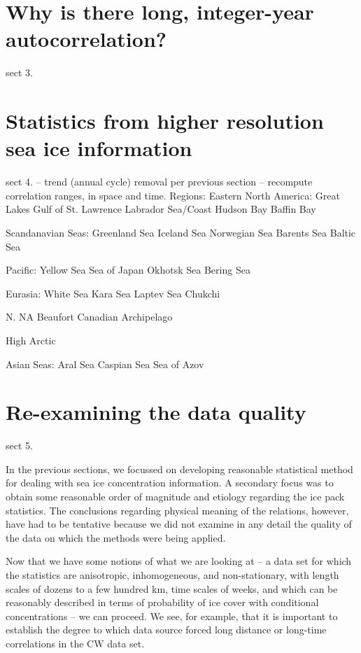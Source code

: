 \section{Why is there long, integer-year autocorrelation?}
sect 3.

\section{Statistics from higher resolution sea ice information}
sect 4.
-- trend (annual cycle) removal per previous section
-- recompute correlation ranges, in space and time.
Regions:
Eastern North America:
  Great Lakes
  Gulf of St. Lawrence
  Labrador Sea/Coast
  Hudson Bay
  Baffin Bay
  
Scandanavian Seas:
  Greenland Sea
  Iceland Sea
  Norwegian Sea
  Barents Sea
  Baltic Sea

Pacific:
  Yellow Sea
  Sea of Japan
  Okhotsk Sea
  Bering Sea
  
Eurasia:
  White Sea
  Kara Sea
  Laptev Sea
  Chukchi

N. NA
  Beaufort
  Canadian Archipelago

High Arctic

Asian Seas:
  Aral Sea
  Caspian Sea
  Sea of Azov

  
\section{Re-examining the data quality}
sect 5.

  In the previous sections, we focussed on developing reasonable statistical
method for dealing with sea ice concentration information.  A secondary
focus was to obtain some reasonable order of magnitude and etiology regarding
the ice pack statistics.  The conclusions regarding physical meaning of the
relations, however, have had to be tentative because we did not examine in
any detail the quality of the data on which the methods were being applied.

  Now that we have some notions of what we are looking at -- a data set
for which the statistics are anisotropic, inhomogeneous, and non-stationary,
with length scales of dozens to a few hundred km, time scales of weeks, 
and which can be reasonably described in terms of probability of ice cover
with conditional concentrations -- we can proceed.  We see, for example, that
it is important to establish the degree to which data source forced long
distance or long-time correlations in the CW data set.

